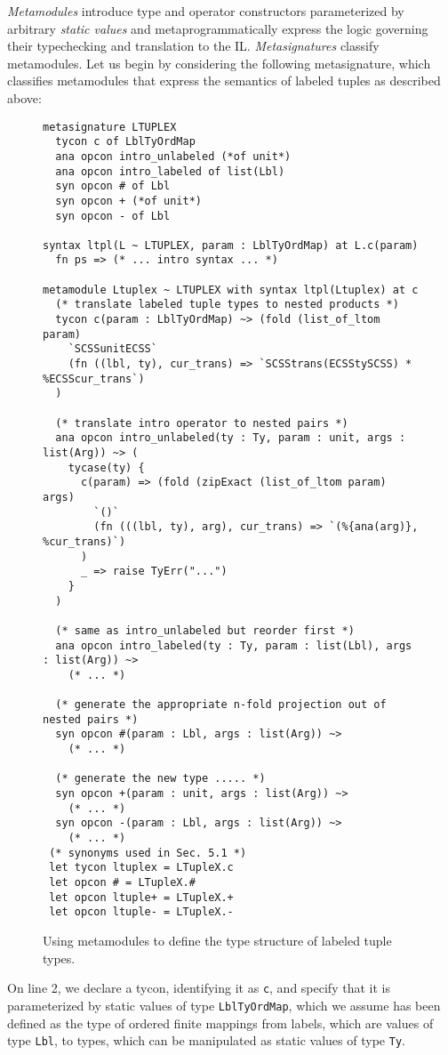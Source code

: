 \emph{Metamodules} introduce type and operator constructors parameterized by arbitrary \emph{static values} and metaprogrammatically express the logic governing their typechecking and  translation to the IL. \emph{Metasignatures} classify metamodules. Let us begin by considering the following metasignature, which classifies metamodules that express the semantics of labeled tuples as described above:
\begin{figure}
\begin{lstlisting}
metasignature LTUPLEX
  tycon c of LblTyOrdMap
  ana opcon intro_unlabeled (*of unit*)
  ana opcon intro_labeled of list(Lbl)
  syn opcon # of Lbl
  syn opcon + (*of unit*)
  syn opcon - of Lbl

syntax ltpl(L ~ LTUPLEX, param : LblTyOrdMap) at L.c(param)
  fn ps => (* ... intro syntax ... *)

metamodule Ltuplex ~ LTUPLEX with syntax ltpl(Ltuplex) at c
  (* translate labeled tuple types to nested products *)
  tycon c(param : LblTyOrdMap) ~> (fold (list_of_ltom param)
    `SCSSunitECSS`
    (fn ((lbl, ty), cur_trans) => `SCSStrans(ECSStySCSS) * %ECSScur_trans`)
  )

  (* translate intro operator to nested pairs *)
  ana opcon intro_unlabeled(ty : Ty, param : unit, args : list(Arg)) ~> (
    tycase(ty) {
      c(param) => (fold (zipExact (list_of_ltom param) args)
      	`()`
      	(fn (((lbl, ty), arg), cur_trans) => `(%{ana(arg)}, %cur_trans)`)
      )
      _ => raise TyErr("...")
    }
  )

  (* same as intro_unlabeled but reorder first *)
  ana opcon intro_labeled(ty : Ty, param : list(Lbl), args : list(Arg)) ~> 
    (* ... *)

  (* generate the appropriate n-fold projection out of nested pairs *)
  syn opcon #(param : Lbl, args : list(Arg)) ~> 
    (* ... *)

  (* generate the new type ..... *)
  syn opcon +(param : unit, args : list(Arg)) ~> 
    (* ... *)
  syn opcon -(param : Lbl, args : list(Arg)) ~> 
    (* ... *)
 (* synonyms used in Sec. 5.1 *)
 let tycon ltuplex = LTupleX.c
 let opcon # = LTupleX.#
 let opcon ltuple+ = LTupleX.+ 
 let opcon ltuple- = LTupleX.-

\end{lstlisting}
\caption{Using metamodules to define the type structure of labeled tuple types.}
\label{fig:ltuplex}
\end{figure}

On line 2, we declare a tycon, identifying it as \lstinline{c}, and specify that it is parameterized by static values of type \lstinline{LblTyOrdMap}, which we assume has been defined as the type of ordered finite mappings from labels, which are values of type \lstinline{Lbl}, to types, which can be manipulated as static values of type \lstinline{Ty}.

